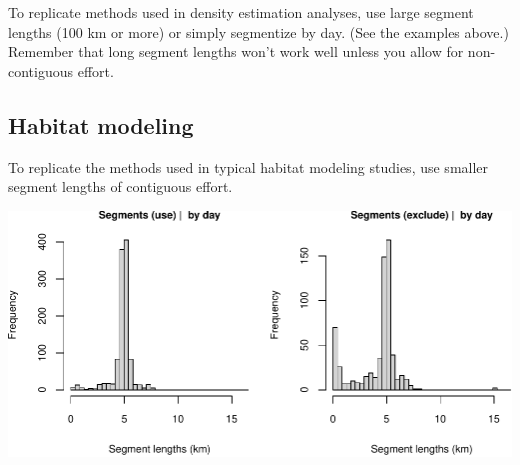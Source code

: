 \documentclass[
]{book}
\newenvironment{Shaded}{\begin{snugshade}}{\end{snugshade}}
\newcommand{\CommentTok}[1]{\textcolor[rgb]{0.56,0.35,0.01}{\textit{#1}}}
\newcommand{\DataTypeTok}[1]{\textcolor[rgb]{0.13,0.29,0.53}{#1}}
\newcommand{\DecValTok}[1]{\textcolor[rgb]{0.00,0.00,0.81}{#1}}
\newcommand{\FloatTok}[1]{\textcolor[rgb]{0.00,0.00,0.81}{#1}}
\newcommand{\KeywordTok}[1]{\textcolor[rgb]{0.13,0.29,0.53}{\textbf{#1}}}
\newcommand{\NormalTok}[1]{#1}
\newcommand{\OperatorTok}[1]{\textcolor[rgb]{0.81,0.36,0.00}{\textbf{#1}}}
\newcommand{\OtherTok}[1]{\textcolor[rgb]{0.56,0.35,0.01}{#1}}
\newcommand{\StringTok}[1]{\textcolor[rgb]{0.31,0.60,0.02}{#1}}
\begin{document}
To replicate methods used in density estimation analyses, use large segment lengths (100 km or more) or simply segmentize by day. (See the examples above.) Remember that long segment lengths won't work well unless you allow for non-contiguous effort.

\hypertarget{habitat-modeling}{%
\subsection*{Habitat modeling}\label{habitat-modeling}}

To replicate the methods used in typical habitat modeling studies, use smaller segment lengths of contiguous effort.

\begin{Shaded}
\end{Shaded}

\includegraphics{figures/unnamed-chunk-109-1.pdf}
\end{document}
